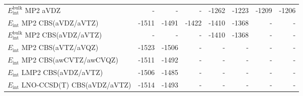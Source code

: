 \begin{longtable}{lrrrrrrr}
$E_\textrm{int}^\textrm{bulk}$ MP2 aVDZ & - & - & - & -1262 & -1223 & -1209 & -1206 \\
$E_\textrm{int}$ MP2 CBS(aVDZ/aVTZ) & -1511 & -1491 & -1422 & -1410 & -1368 & - & - \\
$E_\textrm{int}^\textrm{bulk}$ MP2 CBS(aVDZ/aVTZ) & - & - & - & -1410 & -1368 & - & - \\
$E_\textrm{int}$ MP2 CBS(aVTZ/aVQZ) & -1523 & -1506 & - & - & - & - & - \\
$E_\textrm{int}$ MP2 CBS(awCVTZ/awCVQZ) & -1511 & -1492 & - & - & - & - & - \\
$E_\textrm{int}$ LMP2 CBS(aVDZ/aVTZ) & -1506 & -1485 & - & - & - & - & - \\
$E_\textrm{int}$ LNO-CCSD(T) CBS(aVDZ/aVTZ) & -1514 & -1493 & - & - & - & - & - \\
\end{longtable}